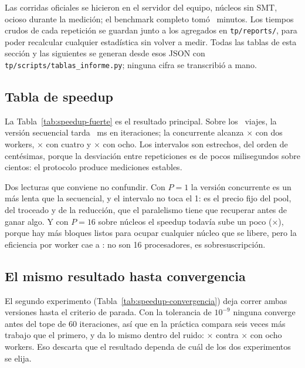 Las corridas oficiales se hicieron en el servidor \texttt{} del equipo,
 núcleos sin SMT, ocioso durante la medición; el benchmark completo tomó
~minutos. Los tiempos crudos de cada repetición se guardan junto a los
agregados en \texttt{tp/reports/}, para poder recalcular cualquier estadística sin volver a medir.
Todas las tablas de esta sección y las siguientes se generan desde esos JSON con
\texttt{tp/scripts/tablas\_informe.py}; ninguna cifra se transcribió a mano.

\subsection{Tabla de speedup}\label{sec:fuerte}



La Tabla~\ref{tab:speedup-fuerte} es el resultado principal. Sobre los ~viajes, la
versión secuencial tarda ~ms en  iteraciones; la concurrente
alcanza $\times$ con dos workers, $\times$ con cuatro y
$\times$ con ocho. Los intervalos son estrechos, del orden de centésimas, porque
la desviación entre repeticiones es de pocos milisegundos sobre cientos: el protocolo produce
mediciones estables.

Dos lecturas que conviene no confundir. Con $P = 1$ la versión concurrente es un
 más lenta que la secuencial, y el intervalo no toca el 1: es el precio fijo
del pool, del troceado y de la reducción, que el paralelismo tiene que recuperar antes de ganar algo.
Y con $P = 16$ sobre  núcleos el speedup todavía sube un poco
($\times$), porque hay más bloques listos para ocupar cualquier núcleo que se
libere, pero la eficiencia por worker cae a : no son 16 procesadores, es
sobresuscripción.

\subsection{El mismo resultado hasta convergencia}



El segundo experimento (Tabla~\ref{tab:speedup-convergencia}) deja correr ambas versiones hasta el
criterio de parada. Con la tolerancia de $10^{-9}$ ninguna converge antes del tope de 60 iteraciones,
así que en la práctica compara seis veces más trabajo que el primero, y da lo mismo dentro del ruido:
$\times$ contra $\times$ con ocho workers. Eso descarta que
el resultado dependa de cuál de los dos experimentos se elija.

